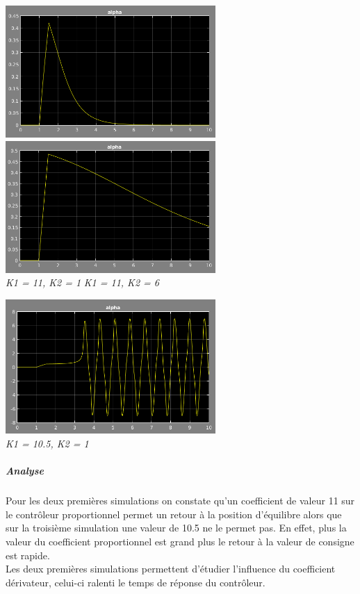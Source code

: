 \documentclass[a4paper,12pt]{article}
\begin{document}
\begin{center}
\includegraphics[width=8cm]{./img/tp2_11_1.png}
\includegraphics[width=8cm]{./img/tp2_11_6.png}\\
\textit{K1 = 11,  K2 = 1 } \hspace{5cm} \textit{K1 = 11,  K2 = 6 }
\bigskip

\includegraphics[width=8cm]{./img/tp2_10,5_1.png}\\
\textit{K1 = 10.5,  K2 = 1 }
\end{center}

\subparagraph{Analyse}

Pour les deux premières simulations on constate qu'un coefficient de valeur 11 sur le contrôleur proportionnel permet un retour à la position d'équilibre alors que sur la troisième simulation une valeur de 10.5 ne le permet pas.
En effet, plus la valeur du coefficient proportionnel est grand plus le retour à la valeur de consigne est rapide.\\
Les deux premières simulations permettent d'étudier l'influence du coefficient dérivateur, celui-ci ralenti le temps de réponse du contrôleur.
\end{document}
